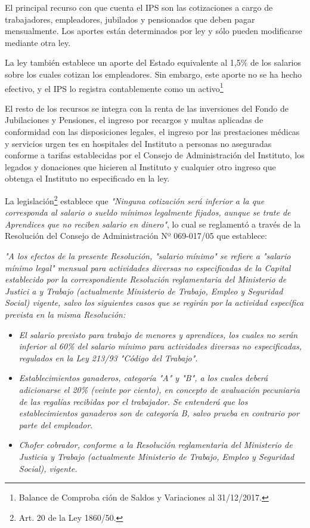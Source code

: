 El principal recurso con que cuenta el IPS son las cotizaciones a cargo
de trabajadores, empleadores, jubilados y pensionados que deben pagar
mensualmente. Los aportes están determinados por ley y sólo pueden
modificarse mediante otra ley.

La ley también establece un aporte del Estado equivalente al 1,5\% de
los salarios sobre los cuales cotizan los empleadores. Sin embargo, este
aporte no se ha hecho efectivo, y el IPS lo registra contablemente como
un activo\footnote{Balance de Comproba
ción de Saldos y Variaciones al 31/12/2017.}

El resto de los recursos se integra con la renta de las inversiones del
Fondo de Jubilaciones y Pensiones, el ingreso por recargos y multas
aplicadas de conformidad con las disposiciones legales, el ingreso por
las prestaciones médicas y servicios urgen tes en hospitales del
Instituto a personas no aseguradas conforme a tarifas establecidas por
el Consejo de Administración del Instituto, los legados y donaciones que
hicieren al Instituto y cualquier otro ingreso que obtenga el Instituto
no especificado en la ley.

La legislación\footnote{Art. 20 de la Ley 1860/50.} establece que
\textit{"Ninguna cotización será inferior a la que corresponda al salario o sueldo mínimos legalmente fijados, aunque se trate de Aprendices que no reciben salario en dinero"},
lo cual se reglamentó a través de la Resolución del Consejo de
Administración Nº 069-017/05 que establece:

\textit{"A los efectos de la presente Resolución, "salario mínimo" se refiere a "salario mínimo legal" mensual para actividades diversas no especificadas de la Capital establecido por la correspondiente Resolución reglamentaria del Ministerio de Justici
a y Trabajo (actualmente Ministerio de Trabajo, Empleo y Seguridad Social) vigente, salvo los siguientes casos que se regirán por la actividad específica prevista en la misma Resolución:}

\begin {itemize}

\item\textit{El salario previsto para trabajo de menores y aprendices, los cuales no serán inferior al 60\% del salario mínimo para actividades diversas no especificadas, regulados en la Ley 213/93 "Código del Trabajo".}

\item\textit{Establecimientos ganaderos, categoría "A" y "B", a los cuales deberá adicionarse el 20\% (veinte por ciento), en concepto de avaluación pecuniaria de las regalías recibidas por el trabajador. Se entenderá que los establecimientos ganaderos 
son de categoría B, salvo prueba en contrario por parte del empleador}.

\item\textit{Chofer cobrador, conforme a la Resolución reglamentaria del Ministerio de Justicia y Trabajo (actualmente Ministerio de Trabajo, Empleo y Seguridad Social), vigente.}

\end{itemize}

